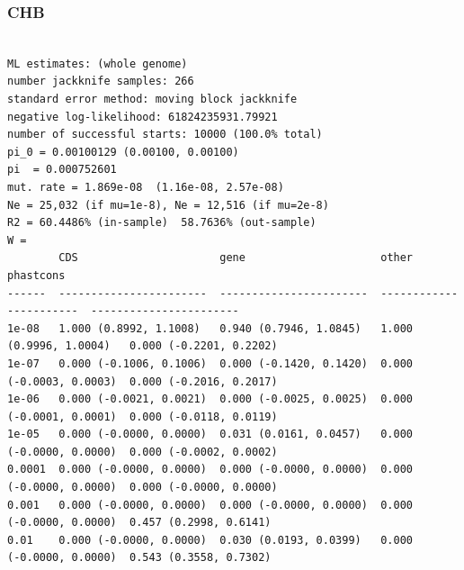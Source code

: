 \documentclass[11pt]{article}
\begin{document}
\subsubsection*{CHB}
\begin{minipage}{\linewidth}\begin{footnotesize}
\begin{verbatim}

ML estimates: (whole genome)
number jackknife samples: 266
standard error method: moving block jackknife
negative log-likelihood: 61824235931.79921
number of successful starts: 10000 (100.0% total)
pi_0 = 0.00100129 (0.00100, 0.00100)
pi  = 0.000752601
mut. rate = 1.869e-08  (1.16e-08, 2.57e-08)
Ne = 25,032 (if mu=1e-8), Ne = 12,516 (if mu=2e-8)
R2 = 60.4486% (in-sample)  58.7636% (out-sample)
W = 
        CDS                      gene                     other                    phastcons
------  -----------------------  -----------------------  -----------------------  -----------------------
1e-08   1.000 (0.8992, 1.1008)   0.940 (0.7946, 1.0845)   1.000 (0.9996, 1.0004)   0.000 (-0.2201, 0.2202)
1e-07   0.000 (-0.1006, 0.1006)  0.000 (-0.1420, 0.1420)  0.000 (-0.0003, 0.0003)  0.000 (-0.2016, 0.2017)
1e-06   0.000 (-0.0021, 0.0021)  0.000 (-0.0025, 0.0025)  0.000 (-0.0001, 0.0001)  0.000 (-0.0118, 0.0119)
1e-05   0.000 (-0.0000, 0.0000)  0.031 (0.0161, 0.0457)   0.000 (-0.0000, 0.0000)  0.000 (-0.0002, 0.0002)
0.0001  0.000 (-0.0000, 0.0000)  0.000 (-0.0000, 0.0000)  0.000 (-0.0000, 0.0000)  0.000 (-0.0000, 0.0000)
0.001   0.000 (-0.0000, 0.0000)  0.000 (-0.0000, 0.0000)  0.000 (-0.0000, 0.0000)  0.457 (0.2998, 0.6141)
0.01    0.000 (-0.0000, 0.0000)  0.030 (0.0193, 0.0399)   0.000 (-0.0000, 0.0000)  0.543 (0.3558, 0.7302)
\end{verbatim}
\end{footnotesize}\end{minipage}
\end{document}
